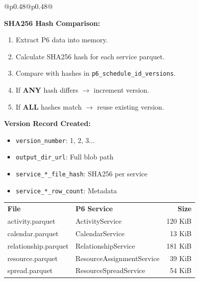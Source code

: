 \documentclass[10pt, a4paper]{article}
\begin{document}
{\begin{tabular}[t]{@{}p{}@{\hspace{0.02\textwidth}}p{}@{}}
    \begin{tikzpicture}
        \node[fill=black!80, text=white, rounded corners=3pt, inner sep=2pt, text width=\linewidth-6pt, align=left] {\textbf{Version Increment Logic}};
    \end{tikzpicture}

    \vspace{0.05em}

    {\footnotesize
    \textbf{SHA256 Hash Comparison:}
    \begin{enumerate}[leftmargin=1.2em, itemsep=0em]
        \item Extract P6 data into memory.
        \item Calculate SHA256 hash for each service parquet.
        \item Compare with hashes in \texttt{p6\_schedule\_id\_versions}.
        \item If \textbf{ANY} hash differs $\rightarrow$ increment version.
        \item If \textbf{ALL} hashes match $\rightarrow$ reuse existing version.
    \end{enumerate}

    \vspace{0.1em}
    \textbf{Version Record Created:}
    \begin{itemize}[leftmargin=1em, itemsep=0em]
        \item \texttt{version\_number}: 1, 2, 3...
        \item \texttt{output\_dir\_url}: Full blob path
        \item \texttt{service\_*\_file\_hash}: SHA256 per service
        \item \texttt{service\_*\_row\_count}: Metadata
    \end{itemize}
    }

    \vspace{0.2em}

    {\footnotesize
    \renewcommand{\arraystretch}{1.1}
    \begin{tabularx}{\linewidth}{@{}lXr@{}}
    \rowcolor{black!10}
    \textbf{File} & \textbf{P6 Service} & \textbf{Size} \\
    \rowcolor{white}
    activity.parquet & ActivityService & 120 KiB \\
    \rowcolor{black!5}
    calendar.parquet & CalendarService & 13 KiB \\
    \rowcolor{white}
    relationship.parquet & RelationshipService & 181 KiB \\
    \rowcolor{black!5}
    resource.parquet & ResourceAssignmentService & 39 KiB \\
    \rowcolor{white}
    spread.parquet & ResourceSpreadService & 54 KiB \\
    \end{tabularx}
    \renewcommand{\arraystretch}{1.0}
    }


\end{tabular}}
\end{document}
